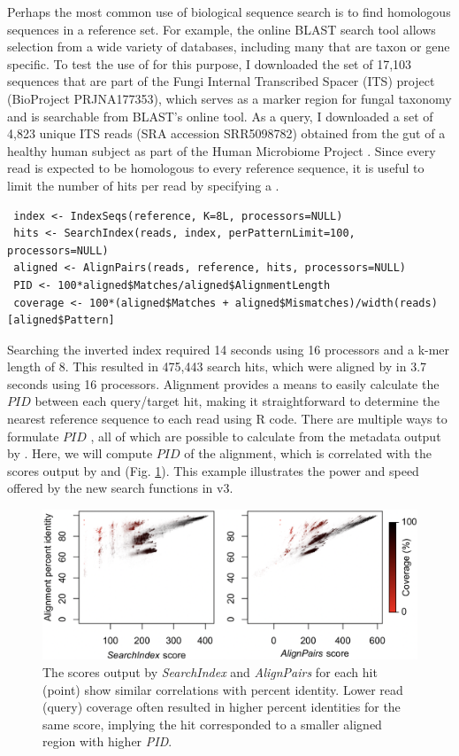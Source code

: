 Perhaps the most common use of biological sequence search is to find homologous sequences in a reference set. For example, the online BLAST search tool allows selection from a wide variety of databases, including many that are taxon or gene specific. To test the use of  for this purpose, I downloaded the set of 17,103 sequences that are part of the Fungi Internal Transcribed Spacer (ITS) project (BioProject PRJNA177353), which serves as a marker region for fungal taxonomy \citep{RN4289} and is searchable from BLAST's online tool. As a query, I downloaded a set of 4,823 unique ITS reads (SRA accession SRR5098782) obtained from the gut of a healthy human subject as part of the Human Microbiome Project \citep{RN4288}. Since every read is expected to be homologous to every reference sequence, it is useful to limit the number of hits per read by specifying a .

\begin{verbatim}
 index <- IndexSeqs(reference, K=8L, processors=NULL)
 hits <- SearchIndex(reads, index, perPatternLimit=100, processors=NULL)
 aligned <- AlignPairs(reads, reference, hits, processors=NULL)
 PID <- 100*aligned$Matches/aligned$AlignmentLength
 coverage <- 100*(aligned$Matches + aligned$Mismatches)/width(reads)[aligned$Pattern]
\end{verbatim}

Searching the inverted index required 14 seconds using 16 processors and a k-mer length of 8. This resulted in 475,443 search hits, which were aligned by  in 3.7 seconds using 16 processors. Alignment provides a means to easily calculate the \(PID\) between each query/target hit, making it straightforward to determine the nearest reference sequence to each read using R code. There are multiple ways to formulate \(PID\) \citep{RN4290}, all of which are possible to calculate from the metadata output by . Here, we will compute \(PID\) of the alignment, which is correlated with the scores output by  and  (Fig. \ref{fig:fig4}). This example illustrates the power and speed offered by the new search functions in  v3.

\begin{figure}
\includegraphics[width=1\linewidth]{figures/Fig4} \caption{The scores output by \textit{SearchIndex} and \textit{AlignPairs} for each hit (point) show similar correlations with percent identity. Lower read (query) coverage often resulted in higher percent identities for the same score, implying the hit corresponded to a smaller aligned region with higher \textit{PID}.}\label{fig:fig4}
\end{figure}

